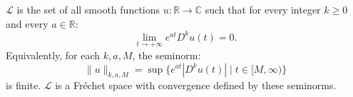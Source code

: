 $\mathcal{L}$ is the set of all smooth functions $u: \mathbb{R} \to \mathbb{C}$ such that for every integer $k \geq 0$ and every $a \in \mathbb{R}$:
\[
\lim_{t \to +\infty} e^{at} D^k u(t) = 0.
\]
Equivalently, for each $k, a, M$, the seminorm:
\[
\|u\|_{k,a,M} = \sup\{e^{at} |D^k u(t)| \mid t \in [M, \infty)\}
\]
is finite. $\mathcal{L}$ is a Fr\'echet space with convergence defined by these seminorms.
